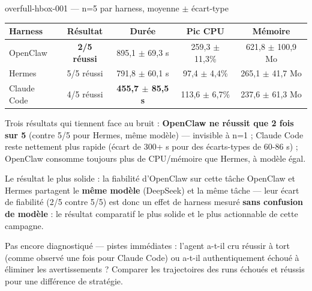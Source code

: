 \documentclass[aspectratio=169]{beamer}
\begin{document}
\begin{frame}{overfull-hbox-001 --- n=5 par harness, moyenne $\pm$ écart-type}
\begin{center}
\renewcommand{\arraystretch}{1.3}
\begin{tabular}{lcccc}
\toprule
Harness & Résultat & Durée & Pic CPU & Mémoire \\
\midrule
OpenClaw     & \textbf{2/5 réussi} & 895,1 $\pm$ 69,3 s  & 259,3 $\pm$ 11,3\% & 621,8 $\pm$ 100,9 Mo \\
Hermes       & 5/5 réussi          & 791,8 $\pm$ 60,1 s  & 97,4 $\pm$ 4,4\%   & 265,1 $\pm$ 41,7 Mo \\
Claude Code  & 4/5 réussi          & \textbf{455,7 $\pm$ 85,5 s} & 113,6 $\pm$ 6,7\%  & 237,6 $\pm$ 61,3 Mo \\
\bottomrule
\end{tabular}
\end{center}

\vspace{0.4cm}
Trois résultats qui tiennent face au bruit : \textbf{OpenClaw ne réussit que
2 fois sur 5} (contre 5/5 pour Hermes, même modèle) --- invisible à n=1 ;
Claude Code reste nettement plus rapide (écart de 300+ s pour des
écarts-types de 60-86 s) ; OpenClaw consomme toujours plus de CPU/mémoire que
Hermes, à modèle égal.
\end{frame}

\begin{frame}{Le résultat le plus solide : la fiabilité d'OpenClaw sur cette tâche}
OpenClaw et Hermes partagent le \textbf{même modèle} (DeepSeek) et la même
tâche --- leur écart de fiabilité (2/5 contre 5/5) est donc un effet de
harness mesuré \textbf{sans confusion de modèle} : le résultat comparatif le
plus solide et le plus actionnable de cette campagne.

\vspace{0.4cm}
Pas encore diagnostiqué --- pistes immédiates : l'agent a-t-il cru réussir à
tort (comme observé une fois pour Claude Code) ou a-t-il authentiquement
échoué à éliminer les avertissements ? Comparer les trajectoires des runs
échoués et réussis pour une différence de stratégie.
\end{frame}
\end{document}
